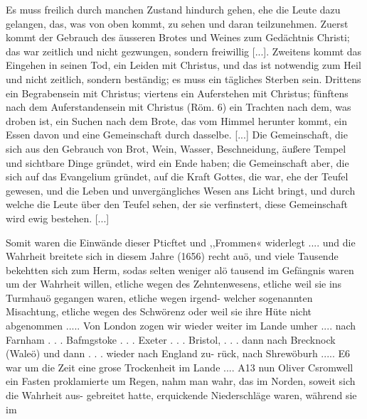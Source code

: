 {    Es muss freilich durch manchen Zustand hindurch gehen, ehe
    die Leute dazu gelangen, das, was von oben kommt, zu sehen
    und daran teilzunehmen. Zuerst kommt der Gebrauch des äusseren
    Brotes und Weines zum Gedächtnis Christi; das war zeitlich und
    nicht gezwungen, sondern freiwillig [...]. Zweitens kommt das
    Eingehen in seinen Tod, ein Leiden mit Christus, und das ist
    notwendig zum Heil und nicht zeitlich, sondern beständig; es muss
    ein tägliches Sterben sein. Drittens ein Begrabensein mit Christus;
    viertens ein Auferstehen mit Christus; fünftens nach 
    dem Auferstandensein mit Christus 
    (Röm. 6) ein Trachten nach dem, was
    droben ist, ein Suchen nach dem Brote, das vom Himmel 
    herunter kommt, ein Essen davon und eine Gemeinschaft durch 
    dasselbe. [...] Die Gemeinschaft, die sich aus den Gebrauch von
    Brot, Wein, Wasser, Beschneidung, äußere Tempel und sichtbare
    Dinge gründet, wird ein Ende haben; die Gemeinschaft aber, die
    sich auf das Evangelium gründet, auf die Kraft Gottes, die war,
    ehe der Teufel gewesen, und die Leben und 
    unvergängliches Wesen
    ans Licht bringt, und durch welche die Leute über den Teufel
    sehen, der sie verfinstert, diese Gemeinschaft wird ewig 
    bestehen. [...]
}


Somit waren die Einwände dieser Pticftet und ,,Frommen«
widerlegt .... und die Wahrheit breitete sich in diesem Jahre
(1656) recht auö, und viele Tausende bekehtten sich zum Herm,
sodas selten weniger alö tausend im Gefängnis waren um der
Wahrheit willen, etliche wegen des Zehntenwesens, etliche
weil sie ins Turmhauö gegangen waren, etliche wegen irgend-
welcher sogenannten Misachtung, etliche wegen des Schwörenz
oder weil sie ihre Hüte nicht abgenommen .....
Von London zogen wir wieder weiter im Lande umher ....
nach Farnham . . . Bafmgstoke . . . Exeter . . . Bristol, . . . dann
nach Brecknock (Waleö) und dann . . . wieder nach England zu-
rück, nach Shrewöburh .....
E6 war um die Zeit eine grose Trockenheit im Lande ....
A13 nun Oliver Csromwell ein Fasten proklamierte um Regen,
nahm man wahr, das im Norden, soweit sich die Wahrheit aus-
gebreitet hatte, erquickende Niederschläge waren, während sie im


